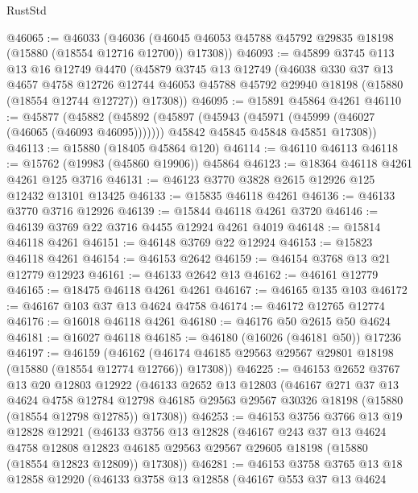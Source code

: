 \begin{lexlean}{RustStd}
\begin{coremodule}
@46065 := @46033
    (@46036 (@46045 @46053 @45788 @45792 @29835 @18198 (@15880 (@18554 @12716 @12700)) @17308))
@46093 := @45899
    @3745
    @113
    @13
    @16
    @12749
    @4470
    (@45879
      @3745
      @13
      @12749
      (@46038
        @330
        @37
        @13
        @4657
        @4758
        @12726
        @12744
        @46053
        @45788
        @45792
        @29940
        @18198
        (@15880 (@18554 @12744 @12727))
        @17308))
@46095 := @15891 @45864 @4261
@46110 := @45877
    (@45882
      (@45892
        (@45897 (@45943 (@45971 (@45999 (@46027 (@46065 (@46093 @46095)))))))
        @45842
        @45845
        @45848
        @45851
        @17308))
@46113 := @15880 (@18405 @45864 @120)
@46114 := @46110 @46113
@46118 := @15762 (@19983 (@45860 @19906)) @45864
@46123 := @18364 @46118 @4261 @4261 @125 @3716
@46131 := @46123 @3770 @3828 @2615 @12926 @125 @12432 @13101 @13425
@46133 := @15835 @46118 @4261
@46136 := @46133 @3770 @3716 @12926
@46139 := @15844 @46118 @4261 @3720
@46146 := @46139 @3769 @22 @3716 @4455 @12924 @4261 @4019
@46148 := @15814 @46118 @4261
@46151 := @46148 @3769 @22 @12924
@46153 := @15823 @46118 @4261
@46154 := @46153 @2642
@46159 := @46154 @3768 @13 @21 @12779 @12923
@46161 := @46133 @2642 @13
@46162 := @46161 @12779
@46165 := @18475 @46118 @4261 @4261
@46167 := @46165 @135 @103
@46172 := @46167 @103 @37 @13 @4624 @4758
@46174 := @46172 @12765 @12774
@46176 := @16018 @46118 @4261
@46180 := @46176 @50 @2615 @50 @4624
@46181 := @16027 @46118
@46185 := @46180 (@16026 (@46181 @50)) @17236
@46197 := @46159
    (@46162 (@46174 @46185 @29563 @29567 @29801 @18198 (@15880 (@18554 @12774 @12766)) @17308))
@46225 := @46153
    @2652
    @3767
    @13
    @20
    @12803
    @12922
    (@46133
      @2652
      @13
      @12803
      (@46167
        @271
        @37
        @13
        @4624
        @4758
        @12784
        @12798
        @46185
        @29563
        @29567
        @30326
        @18198
        (@15880 (@18554 @12798 @12785))
        @17308))
@46253 := @46153
    @3756
    @3766
    @13
    @19
    @12828
    @12921
    (@46133
      @3756
      @13
      @12828
      (@46167
        @243
        @37
        @13
        @4624
        @4758
        @12808
        @12823
        @46185
        @29563
        @29567
        @29605
        @18198
        (@15880 (@18554 @12823 @12809))
        @17308))
@46281 := @46153
    @3758
    @3765
    @13
    @18
    @12858
    @12920
    (@46133
      @3758
      @13
      @12858
      (@46167
        @553
        @37
        @13
        @4624

\end{coremodule}
\end{lexlean}

